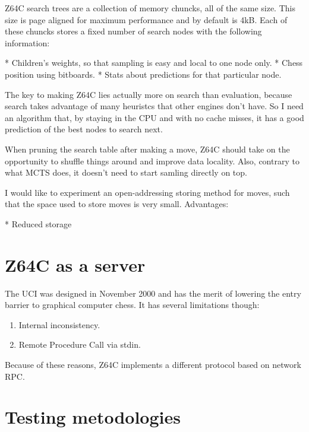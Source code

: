 Z64C search trees are a collection of memory chuncks, all of the same size. This
size is page aligned for maximum performance and by default is 4kB. Each of
these chuncks stores a fixed number of search nodes with the following
information:

* Children's weights, so that sampling is easy and local to one node only.
* Chess position using bitboards.
* Stats about predictions for that particular node.

The key to making Z64C lies actually more on search than evaluation, because
search takes advantage of many heuristcs that other engines don't have. So I
need an algorithm that, by staying in the CPU and with no cache misses, it has a
good prediction of the best nodes to search next.

When pruning the search table after making a move, Z64C should take on the
opportunity to shuffle things around and improve data locality. Also, contrary
to what MCTS does, it doesn't need to start samling directly on top.

I would like to experiment an open-addressing storing method for moves, such
that the space used to store moves is very small. Advantages:

* Reduced storage

\section{Z64C as a server}

The UCI was designed in November 2000 and has the merit of lowering the entry
barrier to graphical computer chess. It has several limitations though:

\begin{enumerate}
\item Internal inconsistency.
\item Remote Procedure Call via stdin.
\end{enumerate}

Because of these reasons, Z64C implements a different protocol based on network
RPC.

\section{Testing metodologies}
